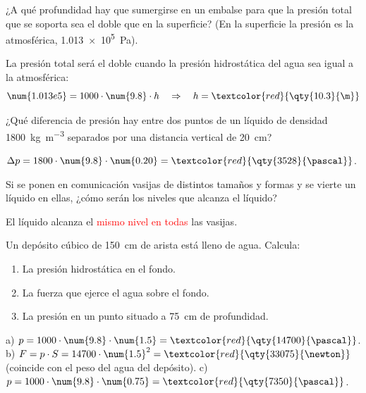 \begin{exercise}
    ¿A qué profundidad hay que sumergirse en un embalse para que la presión total que se soporta sea el doble que en la superficie? (En la superficie la presión es la atmosférica, \qty{1.013e5}{\pascal}).
    \begin{solu}
        La presión total será el doble cuando la presión hidrostática del agua sea igual a la atmosférica:
        \[ \num{1.013e5} = 1000 \cdot \num{9.8} \cdot h \quad\Rightarrow\quad h = \textcolor{red}{\qty{10.3}{\m}} \]
    \end{solu}
\end{exercise}

\begin{exercise}
    ¿Qué diferencia de presión hay entre dos puntos de un líquido de densidad \qty{1800}{\kg\per\cubic\m} separados por una distancia vertical de \qty{20}{\cm}?
    \begin{solu}
        \(\Delta p = 1800 \cdot \num{9.8} \cdot \num{0.20} = \textcolor{red}{\qty{3528}{\pascal}}\).
    \end{solu}
\end{exercise}

\begin{exercise}
    Si se ponen en comunicación vasijas de distintos tamaños y formas y se vierte un líquido en ellas, ¿cómo serán los niveles que alcanza el líquido?
    \begin{solu}
        El líquido alcanza el \textcolor{red}{mismo nivel en todas} las vasijas.
    \end{solu}
\end{exercise}

\begin{exercise}
    Un depósito cúbico de \qty{150}{\cm} de arista está lleno de agua. Calcula:
    \begin{enumerate}[label=\alph*)]
        \item La presión hidrostática en el fondo.
        \item La fuerza que ejerce el agua sobre el fondo.
        \item La presión en un punto situado a \qty{75}{\cm} de profundidad.
    \end{enumerate}
    \begin{solu}
        a) \(p = 1000 \cdot \num{9.8} \cdot \num{1.5} = \textcolor{red}{\qty{14700}{\pascal}}\).
        b) \(F = p \cdot S = 14700 \cdot \num{1.5}^2 = \textcolor{red}{\qty{33075}{\newton}}\) (coincide con el peso del agua del depósito).
        c) \(p = 1000 \cdot \num{9.8} \cdot \num{0.75} = \textcolor{red}{\qty{7350}{\pascal}}\).
    \end{solu}
\end{exercise}


